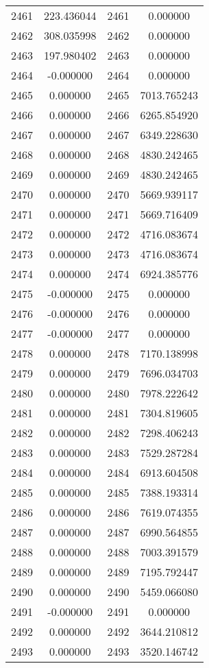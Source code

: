 \documentclass[12pt]{article}
\begin{document}
\begin{longtable}{@{}cccc@{}}
2461 & 223.436044 & 2461 & 0.000000 \\
2462 & 308.035998 & 2462 & 0.000000 \\
2463 & 197.980402 & 2463 & 0.000000 \\
2464 & -0.000000 & 2464 & 0.000000 \\
2465 & 0.000000 & 2465 & 7013.765243 \\
2466 & 0.000000 & 2466 & 6265.854920 \\
2467 & 0.000000 & 2467 & 6349.228630 \\
2468 & 0.000000 & 2468 & 4830.242465 \\
2469 & 0.000000 & 2469 & 4830.242465 \\
2470 & 0.000000 & 2470 & 5669.939117 \\
2471 & 0.000000 & 2471 & 5669.716409 \\
2472 & 0.000000 & 2472 & 4716.083674 \\
2473 & 0.000000 & 2473 & 4716.083674 \\
2474 & 0.000000 & 2474 & 6924.385776 \\
2475 & -0.000000 & 2475 & 0.000000 \\
2476 & -0.000000 & 2476 & 0.000000 \\
2477 & -0.000000 & 2477 & 0.000000 \\
2478 & 0.000000 & 2478 & 7170.138998 \\
2479 & 0.000000 & 2479 & 7696.034703 \\
2480 & 0.000000 & 2480 & 7978.222642 \\
2481 & 0.000000 & 2481 & 7304.819605 \\
2482 & 0.000000 & 2482 & 7298.406243 \\
2483 & 0.000000 & 2483 & 7529.287284 \\
2484 & 0.000000 & 2484 & 6913.604508 \\
2485 & 0.000000 & 2485 & 7388.193314 \\
2486 & 0.000000 & 2486 & 7619.074355 \\
2487 & 0.000000 & 2487 & 6990.564855 \\
2488 & 0.000000 & 2488 & 7003.391579 \\
2489 & 0.000000 & 2489 & 7195.792447 \\
2490 & 0.000000 & 2490 & 5459.066080 \\
2491 & -0.000000 & 2491 & 0.000000 \\
2492 & 0.000000 & 2492 & 3644.210812 \\
2493 & 0.000000 & 2493 & 3520.146742 \\

\end{longtable}
\end{document}
